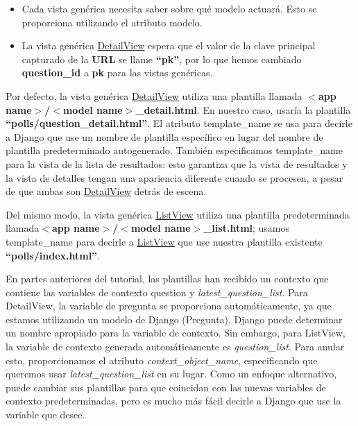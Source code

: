 \documentclass[10pt]{article}
\newcommand{\django}[1]{{\textcolor{G}{Django} #1}}
\begin{document}
\begin{itemize}
\item 
Cada vista genérica necesita saber sobre qué modelo actuará. Esto se proporciona utilizando el atributo modelo.
\item
La vista genérica {\href{https://docs.djangoproject.com/en/3.0/ref/class-based-views/generic-display/\#django.views.generic.detail.DetailView}{\textcolor{B}{DetailView}}} espera que el valor de la clave principal capturado de la \textbf{URL} se llame \textbf{``pk''}, por lo que hemos cambiado \textbf{question\_id} a \textbf{pk} para las vistas genéricas.
\end{itemize}


Por defecto, la vista genérica {\href{https://docs.djangoproject.com/en/3.0/ref/class-based-views/generic-display/\#django.views.generic.detail.DetailView}{\textcolor{B}{DetailView}}} utiliza una plantilla llamada  \textbf{$<$app name$>$/$<$model name$>$\_detail.html}. En nuestro caso, usaría la plantilla \textbf{``polls/question\_detail.html''}. El atributo \textcolor{G}{template\_name} se usa para decirle a \django{} que use un nombre de plantilla específico en lugar del nombre de plantilla predeterminado autogenerado. También especificamos \textcolor{G}{template\_name} para la vista de la lista de resultados: esto garantiza que la vista de resultados y la vista de detalles tengan una apariencia diferente cuando se procesen, a pesar de que ambas son {\href{https://docs.djangoproject.com/en/3.0/ref/class-based-views/generic-display/\#django.views.generic.detail.DetailView}{\textcolor{B}{DetailView}}} detrás de escena.


Del mismo modo, la vista genérica {\href{https://docs.djangoproject.com/en/3.0/ref/class-based-views/generic-display/\#django.views.generic.list.ListView}{\textcolor{B}{ListView}}} utiliza una plantilla predeterminada llamada\textbf{$<$app name$>$/$<$model name$>$\_list.html}; usamos \textcolor{G}{template\_name} para decirle a {\href{https://docs.djangoproject.com/en/3.0/ref/class-based-views/generic-display/\#django.views.generic.list.ListView}{\textcolor{B}{ListView}}} que use nuestra plantilla existente \textbf{``polls/index.html''}.


En partes anteriores del tutorial, las plantillas han recibido un contexto que contiene las variables de contexto question y \textit{latest\_question\_list}. Para DetailView, la variable de pregunta se proporciona automáticamente, ya que estamos utilizando un modelo de Django (Pregunta), Django puede determinar un nombre apropiado para la variable de contexto. Sin embargo, para ListView, la variable de contexto generada automáticamente es \textit{question\_list}. Para anular esto, proporcionamos el atributo \textit{context\_object\_name}, especificando que queremos usar \textit{latest\_question\_list} en su lugar. Como un enfoque alternativo, puede cambiar sus plantillas para que coincidan con las nuevas variables de contexto predeterminadas, pero es mucho más fácil decirle a Django que use la variable que desee.
\end{document}
